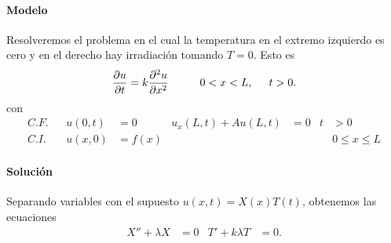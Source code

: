 \documentclass[11pt,letterpaper,draft]{report}
\theoremstyle{plain}
\theoremstyle{definition}
\theoremstyle{remark}
\newcommand\<{\langle}
\renewcommand\>{\rangle}
\begin{document}
\paragraph{Modelo}
Resolveremos el problema en el cual la temperatura en el extremo
izquier\-do es cero y en el derecho hay irradiación tomando $T=0$.
Esto es
\[
  \frac{\partial u}{\partial t}
  = k
  \frac{\partial ^2 u}{\partial x^2}
  \hspace{10mm} 0<x<L,
  \hspace{5mm} t>0.
\]
con
\begin{align*}
  C.F. && u(0,t) &= 0 & u_x(L,t) + Au(L,t) &= 0 &t&>0 \\
  C.I. && u(x,0) &= f(x) & &&& 0\leq x\leq L
\end{align*}
\paragraph{Solución}
Separando variables con el supuesto $u(x,t)=X(x)T(t)$,
obtenemos las ecuaciones
\begin{align*}
  X''+\lambda X &= 0
  &
  T'+k\lambda T &= 0.
\end{align*}
\end{document}
